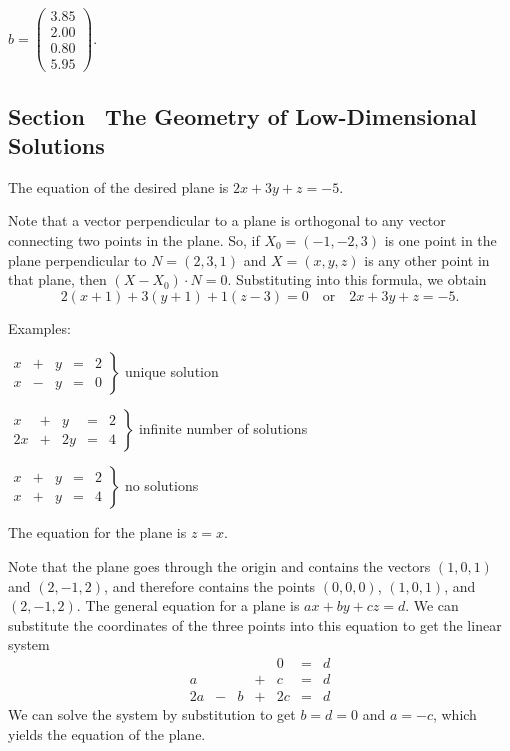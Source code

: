 \documentclass{ximera}
\begin{document}
$b = \left(\begin{array}{r} 3.85 \\ 2.00 \\ 0.80 \\ 5.95\end{array} \right)$.



\subsection*{Section~\protect{\ref{S:2.2}} The Geometry of Low-Dimensional
Solutions}

\ans The equation of the desired plane is $2x + 3y + z = -5$.

\soln Note that a vector perpendicular to a plane is orthogonal
to any vector connecting two points in the plane.  So,
if $X_0 = (-1,-2,3)$ is one point in the plane perpendicular to
$N = (2,3,1)$ and $X = (x,y,z)$ is any other point in that plane,
then $(X - X_0) \cdot N = 0$.  Substituting into this formula, we obtain
\[
2(x + 1) + 3(y + 1) + 1(z - 3) = 0\quad\mbox{or}\quad
2x + 3y + z = -5.
\]

Examples:

$\left. \begin{array}{rrrrr}
x & + & y & = & 2 \\
x & - & y & = & 0\end{array} \right\}$
unique solution

$\left. \begin{array}{rrrrr}
x & + & y & = & 2 \\
2x & + & 2y & = & 4\end{array} \right\}$
infinite number of solutions

$\left. \begin{array}{rrrrr}
x & + & y & = & 2 \\
x & + & y & = & 4\end{array} \right\}$
no solutions

\ans The equation for the plane is $z = x$.

\soln Note that the plane goes through the origin and contains the
vectors $(1,0,1)$ and $(2,-1,2)$, and therefore contains the points
$(0,0,0)$, $(1,0,1)$, and $(2,-1,2)$.  The general equation for a plane
is $ax + by + cz = d$.  We can substitute the coordinates of the three
points into this equation to get the linear system
\[
\begin{array}{rrrrrrr}
 & & & & 0 & = & d \\
a & & & + & c & = & d \\
2a & - & b & + & 2c & = & d\end{array}
\]
We can solve the system by substitution to get $b = d = 0$ and $a = -c$,
which yields the equation of the plane.
\end{document}
